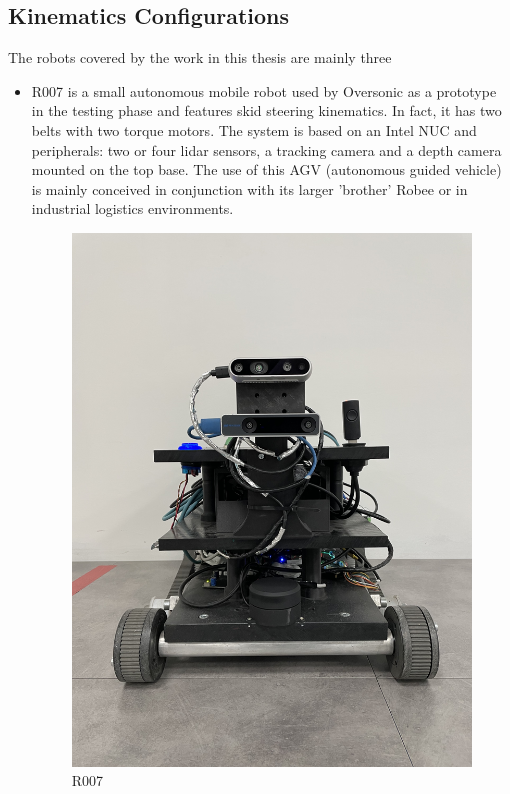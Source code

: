 \subsection{Kinematics Configurations}
The robots covered by the work in this thesis are mainly three 
\begin{itemize}
    \item R007 is a small autonomous mobile robot used by Oversonic as a prototype in the testing phase and features skid steering kinematics. In fact, it has two belts with two torque motors. The system is based on an Intel NUC and peripherals: two or four lidar sensors, a tracking camera and a depth camera mounted on the top base. The use of this AGV (autonomous guided vehicle) is mainly conceived in conjunction with its larger 'brother' Robee or in industrial logistics environments.
    \begin{figure}[H]
        \centering
        \includegraphics[scale=0.05]{Images/Chapter 3/r007.jpg}
        \caption{R007}

\end{figure}
\end{itemize}
